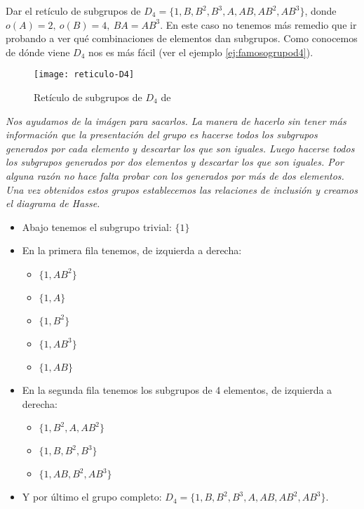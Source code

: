 \begin{ej}
	Dar el retículo de subgrupos de $D_4 = \{1, B, B^2, B^3, A, AB, AB^2, AB^3\}$, donde $o(A) = 2,\ o(B) = 4,\ BA=AB^3$. En este caso no tenemos más remedio que ir probando a ver qué combinaciones de elementos dan subgrupos. Como conocemos de dónde viene $D_4$ nos es más fácil (ver el ejemplo \ref{ej:famosogrupod4}).
	
	
	\begin{figure}[h]
		\centering
		\texttt{[image: reticulo-D4]}
		\label{fig:reticuloD4}
		\caption{Retículo de subgrupos de $D_4$ de \cite{d4sub}}
	\end{figure}
	
	\textit{Nos ayudamos de la imágen para sacarlos. La manera de hacerlo sin tener más información que la presentación del grupo es hacerse todos los subgrupos generados por cada elemento y descartar los que son iguales. Luego hacerse todos los subgrupos generados por dos elementos y descartar los que son iguales. Por alguna razón no hace falta probar con los generados por más de dos elementos. Una vez obtenidos estos grupos establecemos las relaciones de inclusión y creamos el diagrama de Hasse.}
	\begin{itemize}
		\item Abajo tenemos el subgrupo trivial: $\{1\}$
		\item En la primera fila tenemos, de izquierda a derecha:
		\begin{itemize}
			\item $\{1, AB^2\}$
			\item $\{1, A\}$
			\item $\{1, B^2\}$
			\item $\{1, AB^3\}$
			\item $\{1, AB\}$
		\end{itemize}
		\item En la segunda fila tenemos los subgrupos de 4 elementos, de izquierda a derecha:
		\begin{itemize}
			\item $\{1, B^2, A, AB^2\}$
			\item $\{1, B, B^2, B^3\}$
			\item $\{1, AB, B^2, AB^3\}$
		\end{itemize}
		\item Y por último el grupo completo: $D_4 = \{1, B, B^2, B^3, A, AB, AB^2, AB^3\}$.
	\end{itemize}
\end{ej}

